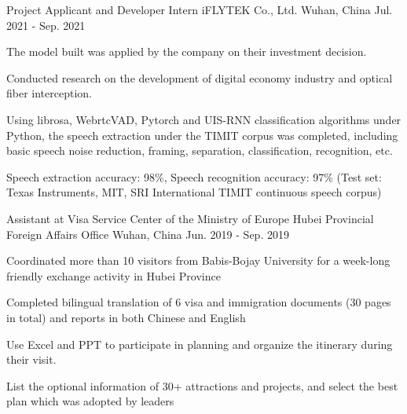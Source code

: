 

\begin{cventries}

  \cventry
    {Project Applicant and Developer Intern} %
    {iFLYTEK Co., Ltd.} %
    {Wuhan, China} %
    {Jul. 2021 - Sep. 2021} %
    {
      \begin{cvitems} %
        \item {The model built was applied by the company on their investment decision.}
        \item {Conducted research on the development of digital economy industry and optical fiber interception.}
        \item {Using librosa, WebrtcVAD, Pytorch and UIS-RNN classification algorithms under Python, the speech extraction under the TIMIT corpus was completed, including basic speech noise reduction, framing, separation, classification, recognition, etc.}
        \item {Speech extraction accuracy: 98\%, Speech recognition accuracy: 97\% (Test set: Texas Instruments, MIT, SRI International TIMIT continuous speech corpus)}
      \end{cvitems}
    }

  \cventry
    {Assistant at Visa Service Center of the Ministry of Europe} %
    {Hubei Provincial Foreign Affairs Office} %
    {Wuhan, China} %
    {Jun. 2019 - Sep. 2019} %
    {
      \begin{cvitems} %
        \item {Coordinated more than 10 visitors from Babis-Bojay University for a week-long friendly exchange activity in Hubei Province}
        \item {Completed bilingual translation of 6 visa and immigration documents (30 pages in total) and reports in both Chinese and English}
        \item {Use Excel and PPT to participate in planning and organize the itinerary during their visit.}
        \item {List the optional information of 30+ attractions and projects, and select the best plan which was adopted by leaders}
      \end{cvitems}
    }

\end{cventries}
